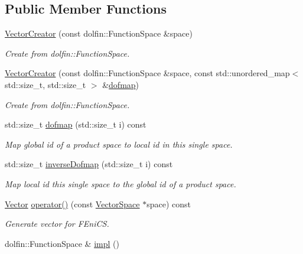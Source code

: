 \subsection*{Public Member Functions}
\begin{DoxyCompactItemize}
\item 
\hyperlink{classSpacy_1_1FEniCS_1_1VectorCreator_aadd31cbf47db5a102001cd97f0a844bc_aadd31cbf47db5a102001cd97f0a844bc}{Vector\+Creator} (const dolfin\+::\+Function\+Space \&space)
\begin{DoxyCompactList}\small\item\em Create from dolfin\+::\+Function\+Space. \end{DoxyCompactList}\item 
\hyperlink{classSpacy_1_1FEniCS_1_1VectorCreator_a4140fedb928d0fa1bdf5e449b2dc964a_a4140fedb928d0fa1bdf5e449b2dc964a}{Vector\+Creator} (const dolfin\+::\+Function\+Space \&space, const std\+::unordered\+\_\+map$<$ std\+::size\+\_\+t, std\+::size\+\_\+t $>$ \&\hyperlink{classSpacy_1_1FEniCS_1_1VectorCreator_ad41a34e44494e8d166f9890a8877f994_ad41a34e44494e8d166f9890a8877f994}{dofmap})
\begin{DoxyCompactList}\small\item\em Create from dolfin\+::\+Function\+Space. \end{DoxyCompactList}\item 
std\+::size\+\_\+t \hyperlink{classSpacy_1_1FEniCS_1_1VectorCreator_ad41a34e44494e8d166f9890a8877f994_ad41a34e44494e8d166f9890a8877f994}{dofmap} (std\+::size\+\_\+t i) const 
\begin{DoxyCompactList}\small\item\em Map global id of a product space to local id in this single space. \end{DoxyCompactList}\item 
std\+::size\+\_\+t \hyperlink{classSpacy_1_1FEniCS_1_1VectorCreator_a8e369dcbb722462ee0bca008eae6b2f3_a8e369dcbb722462ee0bca008eae6b2f3}{inverse\+Dofmap} (std\+::size\+\_\+t i) const 
\begin{DoxyCompactList}\small\item\em Map local id this single space to the global id of a product space. \end{DoxyCompactList}\item 
\hyperlink{classSpacy_1_1FEniCS_1_1Vector}{Vector} \hyperlink{classSpacy_1_1FEniCS_1_1VectorCreator_a5a2881bf1a3fcbda91355b4e3d0ac284_a5a2881bf1a3fcbda91355b4e3d0ac284}{operator()} (const \hyperlink{classSpacy_1_1VectorSpace}{Vector\+Space} $\ast$space) const 
\begin{DoxyCompactList}\small\item\em Generate vector for F\+Eni\+C\+S. \end{DoxyCompactList}\item 
\hypertarget{classSpacy_1_1Mixin_1_1Impl_a5e61399bae41338a87e701b24b13f52a}{}dolfin\+::\+Function\+Space \& \hyperlink{classSpacy_1_1Mixin_1_1Impl_a5e61399bae41338a87e701b24b13f52a}{impl} ()\label{classSpacy_1_1Mixin_1_1Impl_a5e61399bae41338a87e701b24b13f52a}


\end{DoxyCompactItemize}
